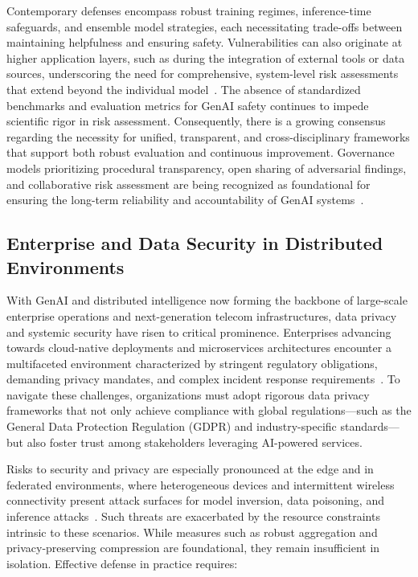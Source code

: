 \documentclass[sigconf]{acmart}
\begin{document}
Contemporary defenses encompass robust training regimes, inference-time safeguards, and ensemble model strategies, each necessitating trade-offs between maintaining helpfulness and ensuring safety. Vulnerabilities can also originate at higher application layers, such as during the integration of external tools or data sources, underscoring the need for comprehensive, system-level risk assessments that extend beyond the individual model~\cite{ref3}. The absence of standardized benchmarks and evaluation metrics for GenAI safety continues to impede scientific rigor in risk assessment. Consequently, there is a growing consensus regarding the necessity for unified, transparent, and cross-disciplinary frameworks that support both robust evaluation and continuous improvement. Governance models prioritizing procedural transparency, open sharing of adversarial findings, and collaborative risk assessment are being recognized as foundational for ensuring the long-term reliability and accountability of GenAI systems~\cite{ref3,ref7}.

\subsection{Enterprise and Data Security in Distributed Environments}

With GenAI and distributed intelligence now forming the backbone of large-scale enterprise operations and next-generation telecom infrastructures, data privacy and systemic security have risen to critical prominence. Enterprises advancing towards cloud-native deployments and microservices architectures encounter a multifaceted environment characterized by stringent regulatory obligations, demanding privacy mandates, and complex incident response requirements~\cite{ref17,ref18,ref19}. To navigate these challenges, organizations must adopt rigorous data privacy frameworks that not only achieve compliance with global regulations---such as the General Data Protection Regulation (GDPR) and industry-specific standards---but also foster trust among stakeholders leveraging AI-powered services.

Risks to security and privacy are especially pronounced at the edge and in federated environments, where heterogeneous devices and intermittent wireless connectivity present attack surfaces for model inversion, data poisoning, and inference attacks~\cite{ref17,ref19,ref23,ref24}. Such threats are exacerbated by the resource constraints intrinsic to these scenarios. While measures such as robust aggregation and privacy-preserving compression are foundational, they remain insufficient in isolation. Effective defense in practice requires:
\end{document}
